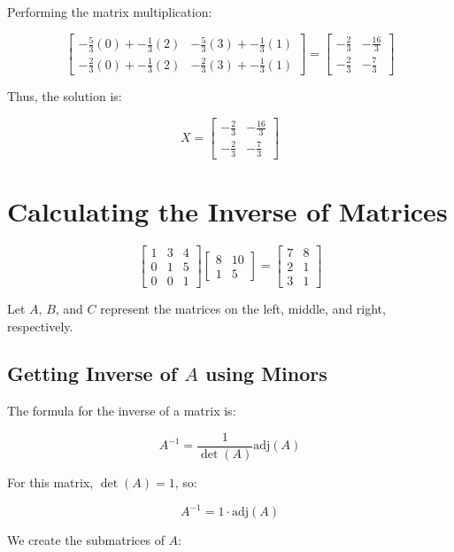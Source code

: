 \documentclass{article}
\begin{document}
Performing the matrix multiplication:

\[
\begin{bmatrix}
-\frac{5}{3}(0) + -\frac{1}{3}(2) & -\frac{5}{3}(3) + -\frac{1}{3}(1) \\
-\frac{2}{3}(0) + -\frac{1}{3}(2) & -\frac{2}{3}(3) + -\frac{1}{3}(1)
\end{bmatrix}
=
\begin{bmatrix}
-\frac{2}{3} & -\frac{16}{3} \\
-\frac{2}{3} & -\frac{7}{3}
\end{bmatrix}
\]

Thus, the solution is:

\[
X = \begin{bmatrix}
-\frac{2}{3} & -\frac{16}{3} \\
-\frac{2}{3} & -\frac{7}{3}
\end{bmatrix}
\]

\section*{Calculating the Inverse of Matrices}

\[
\begin{bmatrix}
1 & 3 & 4 \\
0 & 1 & 5 \\
0 & 0 & 1
\end{bmatrix}
\begin{bmatrix}
8 & 10 \\
1 & 5
\end{bmatrix}
=
\begin{bmatrix}
7 & 8 \\
2 & 1 \\
3 & 1
\end{bmatrix}
\]

Let \( A \), \( B \), and \( C \) represent the matrices on the left, middle, and right, respectively.

\subsection*{Getting Inverse of \( A \) using Minors}
The formula for the inverse of a matrix is:

\[
A^{-1} = \frac{1}{\det(A)} \text{adj}(A)
\]

For this matrix, \( \det(A) = 1 \), so:

\[
A^{-1} = 1 \cdot \text{adj}(A)
\]

We create the submatrices of \( A \):
\end{document}
